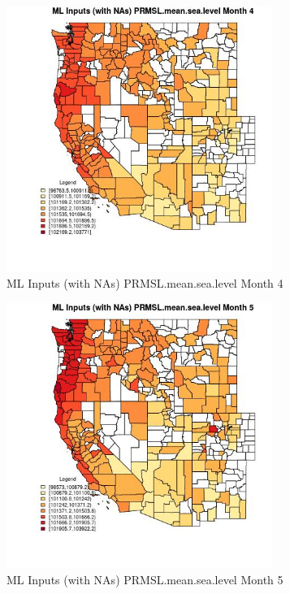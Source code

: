 \begin{figure} 
\centering  
\includegraphics[width=0.77\textwidth]{Code_Outputs/Report_ML_input_PM25_Step4_part_f_de_duplicated_aveswNAs_CountyPRMSLmeansealevelmedianMonth4.jpg} 
\caption{\label{fig:Report_ML_input_PM25_Step4_part_f_de_duplicated_aveswNAsCountyPRMSLmeansealevelmedianMonth4}ML Inputs (with NAs) PRMSL.mean.sea.level Month 4} 
\end{figure} 
 

\begin{figure} 
\centering  
\includegraphics[width=0.77\textwidth]{Code_Outputs/Report_ML_input_PM25_Step4_part_f_de_duplicated_aveswNAs_CountyPRMSLmeansealevelmedianMonth5.jpg} 
\caption{\label{fig:Report_ML_input_PM25_Step4_part_f_de_duplicated_aveswNAsCountyPRMSLmeansealevelmedianMonth5}ML Inputs (with NAs) PRMSL.mean.sea.level Month 5} 
\end{figure} 
 

